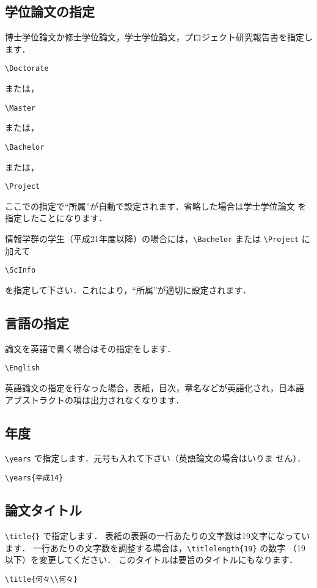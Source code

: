 \documentclass[mingoth]{kut-paper}		%
\begin{document}
  \subsection{学位論文の指定}
  博士学位論文か修士学位論文，学士学位論文，プロジェクト研究報告書を指定します．
\begin{verbatim}
\Doctorate
\end{verbatim}
  または，
\begin{verbatim}
\Master
\end{verbatim}
  または，
\begin{verbatim}
\Bachelor
\end{verbatim}
  または，
\begin{verbatim}
\Project
\end{verbatim}
  ここでの指定で``所属''が自動で設定されます．省略した場合は学士学位論文
  を指定したことになります．

  情報学群の学生（平成21年度以降）の場合には，\verb|\Bachelor| または \verb|\Project| に加えて
\begin{verbatim}
\ScInfo
\end{verbatim}
  を指定して下さい．これにより，``所属''が適切に設定されます．

  \subsection{言語の指定}
  論文を英語で書く場合はその指定をします．
\begin{verbatim}
\English
\end{verbatim}

  英語論文の指定を行なった場合，表紙，目次，章名などが英語化され，日本語
  アブストラクトの項は出力されなくなります．

  \subsection{年度}
  \verb|\years| で指定します．元号も入れて下さい（英語論文の場合はいりま
  せん）．
\begin{verbatim}
\years{平成14}
\end{verbatim}

  \subsection{論文タイトル}
  \verb|\title{}| で指定します．
  表紙の表題の一行あたりの文字数は19文字になっています．
  一行あたりの文字数を調整する場合は，\verb|\titlelength{19}| の数字
  （19以下）を変更してください．
  このタイトルは要旨のタイトルにもなります．
\begin{verbatim}
\title{何々\\何々}
\end{verbatim}
\end{document}
